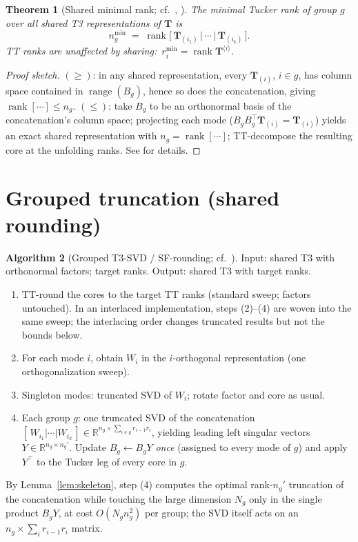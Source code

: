 \documentclass[11pt]{article}
\newtheorem{theorem}{Theorem}[section]
\theoremstyle{definition}
\newtheorem{algorithm}[theorem]{Algorithm}
\theoremstyle{remark}
\newcommand{\R}{\mathbb{R}}
\newcommand{\T}{\boldsymbol{T}}
\newcommand{\rank}{\operatorname{rank}}
\begin{document}
\begin{theorem}[Shared minimal rank; cf.~{\cite[Thm.~1]{MR2026}},
{\cite{Pesh2024}}]\label{thm:sharedrank}
The minimal Tucker rank of group $g$ over all shared T3 representations of
$\T$ is
\[
n_g^{\min} \;=\; \rank\bigl[\,\T_{(i_1)} \,|\, \cdots \,|\, \T_{(i_k)}\,\bigr].
\]
TT ranks are unaffected by sharing:\ $r_i^{\min} = \rank \T^{\langle i\rangle}$.
\end{theorem}

\begin{proof}[Proof sketch]
$(\geq)$: in any shared representation, every $\T_{(i)}$, $i \in g$, has
column space contained in $\operatorname{range}(B_g)$, hence so does the
concatenation, giving $\rank[\cdots] \leq n_g$.
$(\leq)$: take $B_g$ to be an orthonormal basis of the concatenation's column
space; projecting each mode ($B_g B_g^\top \T_{(i)} = \T_{(i)}$) yields an
exact shared representation with $n_g = \rank[\cdots]$; TT-decompose the
resulting core at the unfolding ranks. See \cite{MR2026,Pesh2024} for
details.
\end{proof}

\section{Grouped truncation (shared rounding)}\label{sec:rounding}

\begin{algorithm}[Grouped T3-SVD / SF-rounding; cf.~{\cite[Alg.~1]{MR2026}}]
\label{alg:rounding}
Input: shared T3 with orthonormal factors; target ranks. Output: shared T3
with target ranks.
\begin{enumerate}[label=\emph{(\arabic*)},itemsep=1pt,topsep=2pt]
\item TT-round the cores to the target TT ranks (standard sweep; factors
  untouched). In an interlaced implementation, steps (2)--(4) are woven into
  the same sweep; the interlacing order changes truncated results but not the
  bounds below.
\item For each mode $i$, obtain $W_i$ in the $i$-orthogonal representation
  (one orthogonalization sweep).
\item Singleton modes: truncated SVD of $W_i$; rotate factor and core as
  usual.
\item Each group $g$: one truncated SVD of the concatenation
  $[\,W_{i_1} | \cdots | W_{i_k}\,] \in \R^{n_g \times \sum_{i\in g}
  r_{i-1} r_i}$, yielding leading left singular vectors $Y \in \R^{n_g \times
  n_g'}$. Update $B_g \leftarrow B_g Y$ \emph{once} (assigned to every mode of
  $g$) and apply $Y^\top$ to the Tucker leg of every core in $g$.
\end{enumerate}
By Lemma~\ref{lem:skeleton}, step (4) computes the optimal rank-$n_g'$
truncation of the concatenation while touching the large dimension $N_g$ only
in the single product $B_g Y$, at cost $O(N_g n_g^2)$ per group; the SVD
itself acts on an $n_g \times \sum_i r_{i-1} r_i$ matrix.
\end{algorithm}
\end{document}
